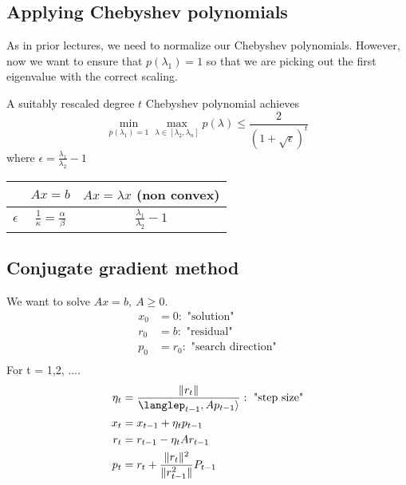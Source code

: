 \subsection{Applying Chebyshev polynomials}
As in prior lectures, we need to normalize our Chebyshev polynomials. However, now we want to ensure that $p(\lambda_1) = 1$ so that we are picking out the first eigenvalue with the correct scaling. 

\begin{lemma}
A suitably rescaled degree $t$ Chebyshev polynomial achieves 
\begin{equation*}
\min_{p(\lambda_1)=1} \max_{\lambda \in [\lambda_2, \lambda_n]} p(\lambda) \leq \frac{2}{(1+\sqrt{\epsilon})^t}
\end{equation*}
where $\epsilon = \frac{\lambda_1}{\lambda_2} - 1$
\end{lemma}

\begin{center}
\begin{tabular}{ | c |c| c | } 
\hline
 & $Ax=b$ & $Ax=\lambda x$ (non convex) \\ 
\hline
$\epsilon$ & $\frac{1}{\kappa} = \frac{\alpha}{\beta}$ & $\frac{\lambda_1}{\lambda_2} -1$ \\ 
\hline
\end{tabular}
\end{center}

\subsection{Conjugate gradient method}
\begin{definition}
We want to solve $Ax = b, \ A \geq 0$. 
\begin{align*}
x_0 &= 0: \text{ "solution"} \\
r_0 &= b: \text{ "residual"} \\
p_0 &= r_0: \text{ "search direction"} \\
\end{align*}
For t = 1,2, ....
\begin{align*}
\eta_t &= \frac{\|r_t\|}{\langlep_{t-1}, Ap_{t-1}\rangle}: \text{ "step size"} \\
x_t &= x_{t-1} + \eta_t p_{t-1} \\
r_t &= r_{t-1} - \eta_t A r_{t-1} \\
p_t &= r_t + \frac{\|r_t\|^2}{\|r_{t-1}^2\|}P_{t-1} \\ 
\end{align*}
\end{definition}

